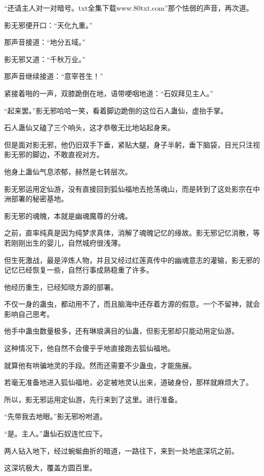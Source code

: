 
\begin{this_body}

“还请主人对一对暗号。txt全集下载www.80txt.com”那个怯弱的声音，再次道。

影无邪便开口：“天化九重。”

那声音接道：“地分五域。”

影无邪又道：“千秋万业。”

那声音继续接道：“意宰苍生！”

紧接着啪的一声，双膝跪倒在地，语带哽咽地道：“石奴拜见主人。”

“起来罢。”影无邪哈哈一笑，看着脚边跪倒的这位石人蛊仙，虚抬手掌。

石人蛊仙又磕了三个响头，这才恭敬无比地站起身来。

但是面对影无邪，他仍旧双手下垂，紧贴大腿，身子半躬，垂下脑袋，目光只注视影无邪的脚边，不敢直视对方。

他身上蛊仙气息浓郁，赫然是七转层次。

影无邪运用定仙游，没有直接回到狐仙福地去抢荡魂山，而是转到了这处影宗在中洲部署的秘密基地。

影无邪的魂魄，本就是幽魂魔尊的分魂。

之前，直率纯真是因为纯梦求真体，消解了魂魄记忆的缘故。影无邪记忆消散，等若刚刚出生的婴儿，自然城府很浅薄。

但生死激战，最是淬炼人物，并且又经过红莲真传中的幽魂意志的灌输，影无邪的记忆已经恢复一些，自然行事成熟稳重了许多。

他经历重生，已经知晓方源的部署。

不仅一身的蛊虫，都动用不了，而且脑海中还存着方源的假意。一个不留神，就会影响自己思考。

他手中蛊虫数量极多，还有琳琅满目的仙蛊，但影无邪却只能动用定仙游。

这种情况下，他自然不会傻乎乎地直接跑去狐仙福地。

就算他有哄骗地灵的手段。然而还需要不少蛊虫，才能施展。

若毫无准备地进入狐仙福地，必定被地灵认出来，道破身份，那样就麻烦大了。

所以，影无邪运用定仙游，先行来到了这里。进行准备。

“先带我去地眼。”影无邪吩咐道。

“是。主人。”蛊仙石奴连忙应下。

两人钻入地下，经过蜿蜒曲折的暗道，一路往下，来到一处地底深坑之前。

这深坑极大，覆盖方圆百里。


\end{this_body}
